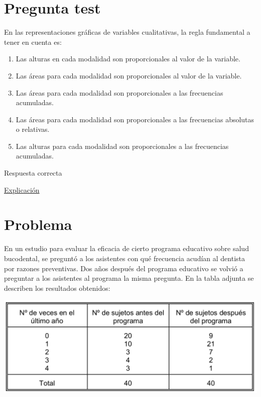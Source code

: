 \documentclass[
]{book}
\providecommand{\tightlist}{%
  \setlength{\itemsep}{0pt}\setlength{\parskip}{0pt}}
\begin{document}
\hypertarget{pregunta-test-55}{%
\section{Pregunta test}\label{pregunta-test-55}}

En las representaciones gráficas de variables cualitativas, la regla fundamental a tener en cuenta es:

\begin{enumerate}
\def\labelenumi{\alph{enumi})}
\tightlist
\item
  Las alturas en cada modalidad son proporcionales al valor de la variable.
\item
  Las áreas para cada modalidad son proporcionales al valor de la variable.
\item
  Las áreas para cada modalidad son proporcionales a las frecuencias acumuladas.
\item
  Las áreas para cada modalidad son proporcionales a las frecuencias absolutas o relativas.
\item
  Las alturas para cada modalidad son proporcionales a las frecuencias acumuladas.
\end{enumerate}

Respuesta correcta

\href{https://1fjmanzano.github.io/bioestadistica/diagramas-de-barras-y-sectores.html}{Explicación}

\hypertarget{problema-8}{%
\section{Problema}\label{problema-8}}

En un estudio para evaluar la eficacia de cierto programa educativo sobre salud bucodental, se preguntó a los asistentes con qué frecuencia acudían al dentista por razones preventivas. Dos años después del programa educativo se volvió a preguntar a los asistentes al programa la misma pregunta. En la tabla adjunta se describen los resultados obtenidos:

\includegraphics[width=16.06in]{img/2_2}
\end{document}
